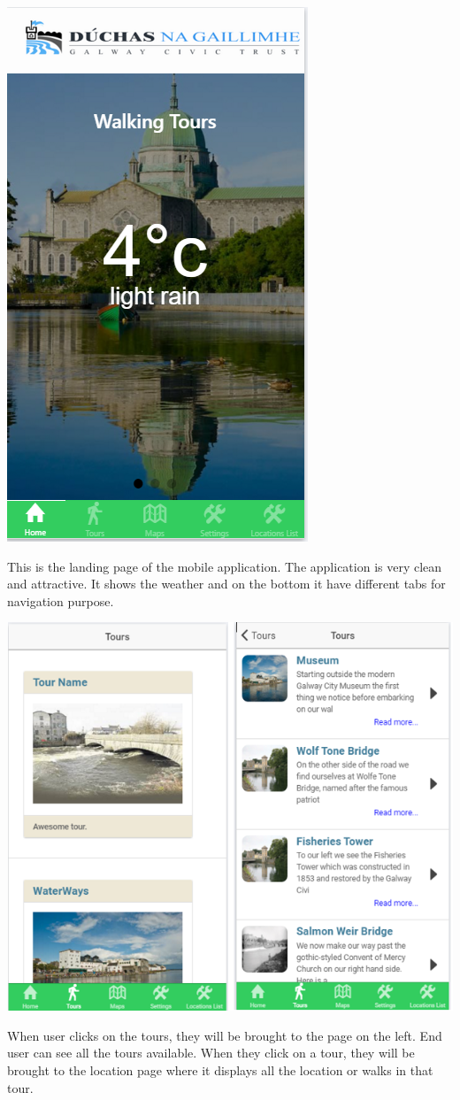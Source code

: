 		 			\begin{center}    
		 				\includegraphics{img/ionicmanepage.PNG}
		 			\end{center}
		 			This is the landing page of the mobile application. The application is very clean and attractive. It shows the weather and on the bottom it have different tabs for navigation purpose. 
		 			
		 				\begin{center}    
		 					\includegraphics{img/toursandlocations.PNG}
		 				\end{center}
		 				When user clicks on the tours, they will be brought to the page on the left. End user can see all the tours available. When they click on a tour, they will be brought to the location page where it displays all the location or walks in that tour. 
